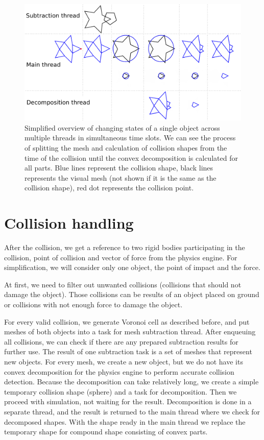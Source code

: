 \begin{figure}
        \centering
        \includegraphics[width=\textwidth]{img/object-progress}
        \caption{Simplified overview of changing states of a single object across multiple threads in simultaneous time slots. We can see the process of splitting the mesh and calculation of collision shapes from the time of the collision until the convex decomposition is calculated for all parts. Blue lines represent the collision shape, black lines represents the visual mesh (not shown if it is the same as the collision shape), red dot represents the collision point.}
        \label{fig:objectInThreads}
\end{figure}

\section{Collision handling}
\label{sec:collisions}
After the collision, we get a reference to two rigid bodies participating in the collision, point of collision and vector of force from the physics engine. For simplification, we will consider only one object, the point of impact and the force.

At first, we need to filter out unwanted collisions (collisions that should not damage the object). Those collisions can be results of an object placed on ground or collisions with not enough force to damage the object. 

For every valid collision, we generate Voronoi cell as described before, and put  meshes of both objects into a task for mesh subtraction thread. After enqueuing all collisions, we can check if there are any prepared subtraction results for further use. The result of one subtraction task is a set of meshes that represent new objects. For every mesh, we create a new object, but we do not have its convex decomposition for the physics engine to perform accurate collision detection. Because the decomposition can take relatively long, we create a simple temporary collision shape (\eg sphere) and a task for decomposition. Then we proceed with simulation, not waiting for the result. Decomposition is done in a separate thread, and the result is returned to the main thread where we check for decomposed shapes. With the shape ready in the main thread we replace the temporary shape for compound shape consisting of convex parts.


